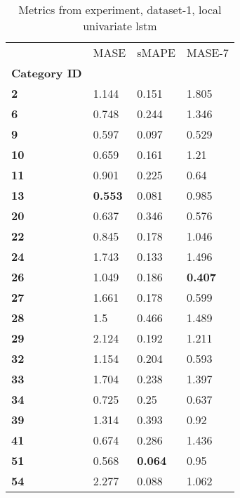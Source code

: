 \begin{table}[H]
\centering
\caption{Metrics from experiment, dataset-1, local univariate lstm}
\label{table:local-univariate-lstm-dataset-1}
\begin{tabular}{llll}
\toprule
{} &            MASE &           sMAPE &          MASE-7 \\
\textbf{Category ID} &                 &                 &                 \\
\midrule
\textbf{2          } &           1.144 &           0.151 &           1.805 \\
\textbf{6          } &           0.748 &           0.244 &           1.346 \\
\textbf{9          } &           0.597 &           0.097 &           0.529 \\
\textbf{10         } &           0.659 &           0.161 &            1.21 \\
\textbf{11         } &           0.901 &           0.225 &            0.64 \\
\textbf{13         } &  \textbf{0.553} &           0.081 &           0.985 \\
\textbf{20         } &           0.637 &           0.346 &           0.576 \\
\textbf{22         } &           0.845 &           0.178 &           1.046 \\
\textbf{24         } &           1.743 &           0.133 &           1.496 \\
\textbf{26         } &           1.049 &           0.186 &  \textbf{0.407} \\
\textbf{27         } &           1.661 &           0.178 &           0.599 \\
\textbf{28         } &             1.5 &           0.466 &           1.489 \\
\textbf{29         } &           2.124 &           0.192 &           1.211 \\
\textbf{32         } &           1.154 &           0.204 &           0.593 \\
\textbf{33         } &           1.704 &           0.238 &           1.397 \\
\textbf{34         } &           0.725 &            0.25 &           0.637 \\
\textbf{39         } &           1.314 &           0.393 &            0.92 \\
\textbf{41         } &           0.674 &           0.286 &           1.436 \\
\textbf{51         } &           0.568 &  \textbf{0.064} &            0.95 \\
\textbf{54         } &           2.277 &           0.088 &           1.062 \\
\bottomrule
\end{tabular}
\end{table}
